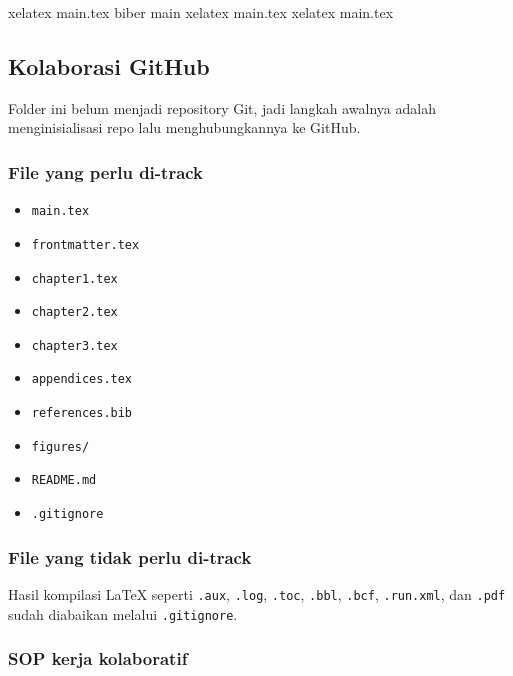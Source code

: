 \documentclass[
]{article}
\newenvironment{Shaded}{}{}
\newcommand{\ExtensionTok}[1]{#1}
\newcommand{\NormalTok}[1]{#1}
\providecommand{\tightlist}{%
  \setlength{\itemsep}{0pt}\setlength{\parskip}{0pt}}
\begin{document}
\begin{Shaded}
\begin{Highlighting}[]
\ExtensionTok{xelatex}\NormalTok{ main.tex}
\ExtensionTok{biber}\NormalTok{ main}
\ExtensionTok{xelatex}\NormalTok{ main.tex}
\ExtensionTok{xelatex}\NormalTok{ main.tex}
\end{Highlighting}
\end{Shaded}

\subsection{Kolaborasi GitHub}\label{kolaborasi-github}

Folder ini belum menjadi repository Git, jadi langkah awalnya adalah
menginisialisasi repo lalu menghubungkannya ke GitHub.

\subsubsection{File yang perlu di-track}\label{file-yang-perlu-di-track}

\begin{itemize}
\tightlist
\item
  \texttt{main.tex}
\item
  \texttt{frontmatter.tex}
\item
  \texttt{chapter1.tex}
\item
  \texttt{chapter2.tex}
\item
  \texttt{chapter3.tex}
\item
  \texttt{appendices.tex}
\item
  \texttt{references.bib}
\item
  \texttt{figures/}
\item
  \texttt{README.md}
\item
  \texttt{.gitignore}
\end{itemize}

\subsubsection{File yang tidak perlu
di-track}\label{file-yang-tidak-perlu-di-track}

Hasil kompilasi LaTeX seperti \texttt{.aux}, \texttt{.log},
\texttt{.toc}, \texttt{.bbl}, \texttt{.bcf}, \texttt{.run.xml}, dan
\texttt{.pdf} sudah diabaikan melalui \texttt{.gitignore}.

\subsubsection{SOP kerja kolaboratif}\label{sop-kerja-kolaboratif}
\end{document}
